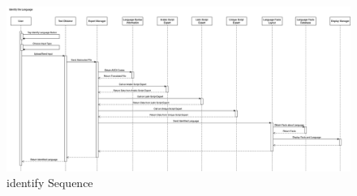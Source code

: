 \begin{figure}[H]
	\centering
	\includegraphics[width=\textwidth, height=\textheight, keepaspectratio]{Section3/images/IdentifyLanguageSequenceDiagram.drawio.png}
	\caption{identify Sequence}
	\label{IdentifySequence}
\end{figure}